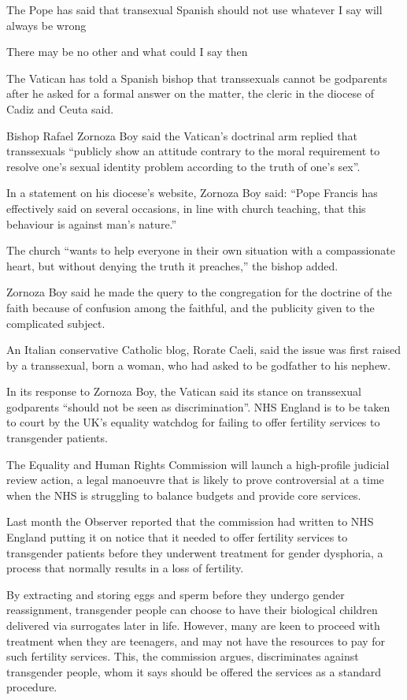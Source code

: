 
The Pope has said that transexual Spanish should not use 
whatever I say will always be wrong

There may be no other and what could I say then



The Vatican has told a Spanish bishop that transsexuals cannot be godparents after he asked for a formal answer on the matter, the cleric in the diocese of Cadiz and Ceuta said.

Bishop Rafael Zornoza Boy said the Vatican’s doctrinal arm replied that transsexuals “publicly show an attitude contrary to the moral requirement to resolve one’s sexual identity problem according to the truth of one’s sex”.

In a statement on his diocese’s website, Zornoza Boy said: “Pope Francis has effectively said on several occasions, in line with church teaching, that this behaviour is against man’s nature.”

The church “wants to help everyone in their own situation with a compassionate heart, but without denying the truth it preaches,” the bishop added.

Zornoza Boy said he made the query to the congregation for the doctrine of the faith because of confusion among the faithful, and the publicity given to the complicated subject.

An Italian conservative Catholic blog, Rorate Caeli, said the issue was first raised by a transsexual, born a woman, who had asked to be godfather to his nephew.

In its response to Zornoza Boy, the Vatican said its stance on transsexual godparents “should not be seen as discrimination”.
NHS England is to be taken to court by the UK’s equality watchdog for failing to offer fertility services to transgender patients.

The Equality and Human Rights Commission will launch a high-profile judicial review action, a legal manoeuvre that is likely to prove controversial at a time when the NHS is struggling to balance budgets and provide core services.

Last month the Observer reported that the commission had written to NHS England putting it on notice that it needed to offer fertility services to transgender patients before they underwent treatment for gender dysphoria, a process that normally results in a loss of fertility.

By extracting and storing eggs and sperm before they undergo gender reassignment, transgender people can choose to have their biological children delivered via surrogates later in life. However, many are keen to proceed with treatment when they are teenagers, and may not have the resources to pay for such fertility services. This, the commission argues, discriminates against transgender people, whom it says should be offered the services as a standard procedure.

